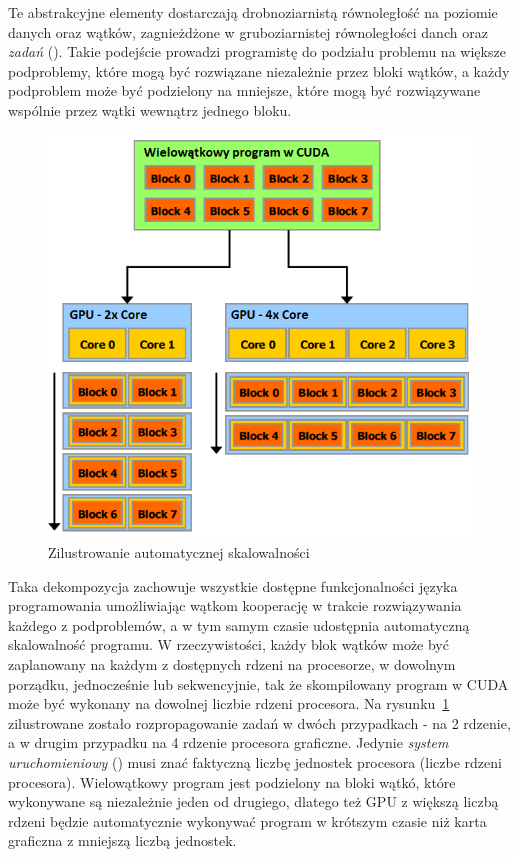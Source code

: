 Te abstrakcyjne elementy dostarczają drobnoziarnistą równoległość na poziomie danych oraz wątków, zagnieżdżone w gruboziarnistej równoległości danch oraz \emph{zadań} (). Takie podejście prowadzi programistę do podziału problemu na większe podproblemy, które mogą być rozwiązane niezależnie przez bloki wątków, a każdy podproblem może być podzielony na mniejsze, które mogą być rozwiązywane wspólnie przez wątki wewnątrz jednego bloku.

\begin{figure}
\centering\includegraphics[width=1.0\textwidth]{figures/03/threads_gpu.png}
\caption{Zilustrowanie automatycznej skalowalności~\cite{Cuda:PGuide}}\label{rys:threads_gpu}
\end{figure}

Taka dekompozycja zachowuje wszystkie dostępne funkcjonalności języka programowania umożliwiając wątkom kooperację w trakcie rozwiązywania każdego z podproblemów, a w tym samym czasie udostępnia automatyczną skalowalność programu. W rzeczywistości, każdy blok wątków może być zaplanowany na każdym z dostępnych rdzeni na procesorze, w dowolnym porządku, jednocześnie lub sekwencyjnie, tak że skompilowany program w CUDA może być wykonany na dowolnej liczbie rdzeni procesora. Na rysunku~\ref{rys:threads_gpu} zilustrowane zostało rozpropagowanie zadań w dwóch przypadkach - na 2 rdzenie, a w drugim przypadku na 4 rdzenie procesora graficzne. Jedynie \emph{system uruchomieniowy} () musi znać faktyczną liczbę jednostek procesora (liczbe rdzeni procesora). Wielowątkowy program jest podzielony na bloki wątkó, które wykonywane są niezależnie jeden od drugiego, dlatego też GPU z większą liczbą rdzeni będzie automatycznie wykonywać program w krótszym czasie niż karta graficzna z mniejszą liczbą jednostek.


